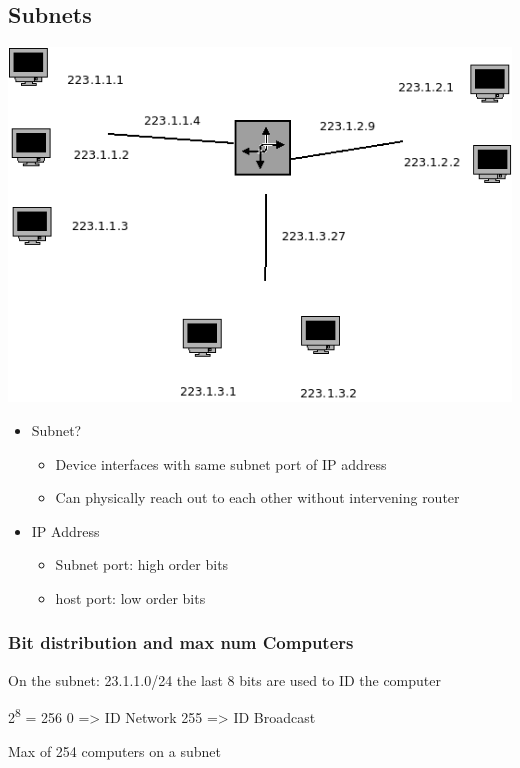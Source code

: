 \documentclass[11pt]{article}
\begin{document}
\subsection{Subnets}
\label{sec:org645fe30}

\begin{center}
\includegraphics[width=.9\linewidth]{../img/subnetsIP.png}
\end{center}

\begin{itemize}
\item Subnet? 
\begin{itemize}
\item Device interfaces with same subnet port of IP address
\item Can physically reach out to each other without intervening router
\end{itemize}
\item IP Address 
\begin{itemize}
\item Subnet port: high order bits
\item host port: low order bits
\end{itemize}
\end{itemize}

\subsubsection{Bit distribution and max num Computers}
\label{sec:orgb3169d9}

On the subnet: 23.1.1.0/24 the last 8 bits are used to ID the computer 

2\textsuperscript{8} = 256 
0 => ID Network
255 => ID Broadcast

Max of 254 computers on a subnet
\end{document}
